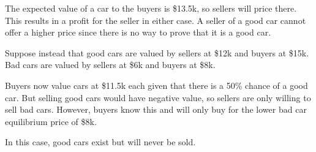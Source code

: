 \documentclass[class=bu430,notes,tikz]{agony}
\begin{document}
The expected value of a car to the buyers is \$13.5k,
so sellers will price there.
This results in a profit for the seller in either case.
A seller of a good car cannot offer a higher price since there is no way to prove
that it is a good car.

Suppose instead that good cars are valued by sellers at \$12k and buyers at \$15k.
Bad cars are valued by sellers at \$6k and buyers at \$8k.

Buyers now value cars at \$11.5k each given that there is a 50\% chance of a good car.
But selling good cars would have negative value,
so sellers are only willing to sell bad cars.
However, buyers know this and will only buy for the lower bad car equilibrium price of \$8k.

In this case, good cars exist but will never be sold.

\pagebreak
{}
\printindex
\end{document}
